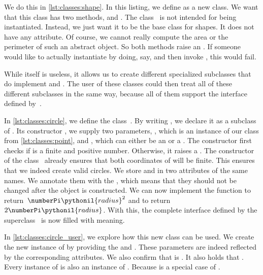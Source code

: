 We do this in \cref{lst:classes:shape}.
In this listing, we define  as a new class.
We want that this class has two methods,  and .
The class~ is not intended for being instantiated.
Instead, we just want it to be the base class for  shapes.
It does not have any attribute.
Of course, we cannot really compute the area or the perimeter of such an abstract object.
So both methods raise an .
If someone would like to actually instantiate  by doing, say,  and then invoke , this would fail.

While  itself is useless, it allows us to create different specialized subclasses that do implement  and .
The user of these classes could then treat all of these different subclasses in the same way, because all of them support the interface defined by~.

In \cref{lst:classes:circle}, we define the class~.
By writing , we declare it as a subclass of .
Its constructor , we supply two parameters, , which is an instance of our class  from \cref{lst:classes:point}, and , which can either be an  or a .
The constructor first checks if  is a finite and positive number.
Otherwise, it raises a .
The constructor of the class~ already ensures that both coordinates of  will be finite.
This ensures that we indeed create valid circles.
We store  and  in two attributes of the same names.
We annotate them with the  , which means that they should not be changed after the object is constructed.
We can now implement the function  to return~$\numberPi\pythonil{radius}^2$ and  to return~$2\numberPi\pythonil{radius}$.
With this, the complete interface defined by the superclass~ is now filled with meaning.

In \cref{lst:classes:circle_user}, we explore how this new class can be used.
We create the new instance  of  by providing the  and .
These parameters are indeed reflected by the corresponding attributes.
We also confirm that  is .
It also holds that .
Every instance of  is also an instance of .
Because  is a special case of .
%
\endhsection%
